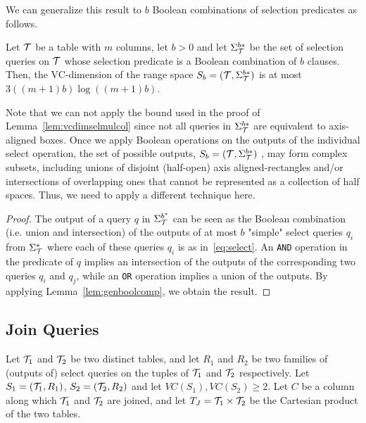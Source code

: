 We can generalize this result to $b$ Boolean combinations of selection
predicates as follows.

\begin{lemma}\label{lem:vcdimselgen}
  Let ${\cal T}$ be a table with $m$ columns, let $b>0$ and let $\Sigma^{b*}_{\cal T}$
  be the set of selection queries on ${\cal T}$ whose selection predicate is a
  Boolean combination of $b$ clauses. Then, the VC-dimension of the range space
  $S_b = ({\cal T}, \Sigma^{b*}_{\cal T})$ is at most $3((m+1)b)\log((m+1)b)$.  
\end{lemma}

Note that we can not apply the bound
used in the proof of Lemma~\ref{lem:vcdimselmulcol} since
not all queries in $\Sigma^{b*}_{\cal T}$ are equivalent to axis-aligned
boxes. Once we apply Boolean operations on the outputs of the individual select
operation, the set of possible outputs, $S_b = ({\cal T}, \Sigma^{b*}_{\cal T})$ , may
form complex subsets, including unions of disjoint (half-open) axis
aligned-rectangles and/or intersections of overlapping ones that cannot be
represented as a collection of half spaces. Thus, we need to apply a different technique here.

\begin{proof} 
 The output of a query $q$ in $\Sigma^{b^*}_{\cal T}$ can be seen as the Boolean
 combination (i.e. union and intersection) of the outputs of at most $b$
 "simple" select queries $q_i$ from $\Sigma^{*}_{\cal T}$ where each of these
 queries $q_i$ is as in~\eqref{eq:select}. An \texttt{AND} operation in the
 predicate of $q$ implies an intersection of the outputs of  the corresponding
 two queries $q_i$ and $q_j$, while an \texttt{OR} operation implies a union of
 the outputs. By applying Lemma~\ref{lem:genboolcomp}, we obtain the result.
\end{proof}

\subsection{Join Queries}\label{sec:vcdimjoinqueries}
Let ${\cal T}_1$ and ${\cal T}_2$ be two distinct tables, and let $R_1$ and $R_2$
be two families of (outputs of) select queries on the tuples of ${\cal T}_1$ and
${\cal T}_2$ respectively. Let $S_1=({\cal T}_1,R_1)$, $S_2=({\cal T}_2,R_2)$ and let
$VC(S_1),VC(S_2)\geq 2$. Let $C$ be a column along which ${\cal T}_1$ and ${\cal T}_2$
are joined, and let $T_J={\cal T}_1\times{\cal T}_2$ be the Cartesian product of the two
tables.

